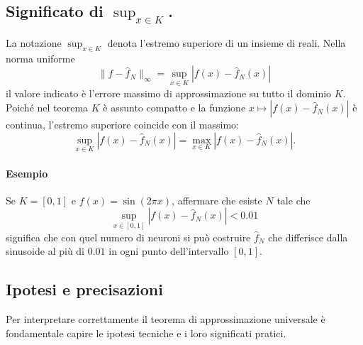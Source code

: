 \documentclass[a4paper,12pt]{report}
\begin{document}
	\subsection{Significato di \(\sup_{x\in K}\).}
	La notazione \(\sup_{x\in K}\) denota l'estremo superiore di un insieme di reali. Nella norma uniforme
	\[
	\|f-\hat f_N\|_\infty=\sup_{x\in K}|f(x)-\hat f_N(x)|
	\]
	il valore indicato è l'errore massimo di approssimazione su tutto il dominio \(K\). Poiché nel teorema \(K\) è assunto compatto e la funzione \(x\mapsto|f(x)-\hat f_N(x)|\) è continua, l'estremo superiore coincide con il massimo:
	\[
	\sup_{x\in K}|f(x)-\hat f_N(x)|=\max_{x\in K}|f(x)-\hat f_N(x)|.
	\]
	
	\paragraph{Esempio} Se \(K=[0,1]\) e \(f(x)=\sin(2\pi x)\), affermare che esiste \(N\) tale che
	\[
	\sup_{x\in[0,1]}|f(x)-\hat f_N(x)|<0.01
	\]
	significa che con quel numero di neuroni si può costruire \(\hat f_N\) che differisce dalla sinusoide al più di \(0.01\) in ogni punto dell'intervallo \([0,1]\).
	
	\subsection{Ipotesi e precisazioni}
	Per interpretare correttamente il teorema di approssimazione universale è fondamentale capire le ipotesi tecniche e i loro significati pratici.
	
\end{document}
